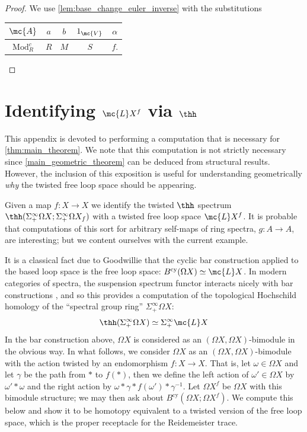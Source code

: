 \documentclass[11pt]{amsart}
\begin{document}
\begin{proof}
We use \cref{lem:base_change_euler_inverse} with the substitutions
\begin{center}
\begin{tabular}{c|c|c|c|c}
 $\mc{A}$ 
&$a$
&$b$ 
&$1_\mc{V}$
&$\alpha$
\\
\hline
 $ \operatorname{Mod}^c_R$ 
&$R$ 
&$M$ 
&$S$
&$f$. 
\end{tabular}
\end{center}
\end{proof} 



\appendix



\section{Identifying $\mc{L} X^f$ via $\thh$}\label{sect:identify_thh}



This appendix is devoted to performing a computation that is necessary for \cref{thm:main_theorem}. We note that this computation is not strictly necessary since \cref{main_geometric_theorem} can be deduced from structural results. However, the inclusion of this exposition is useful for understanding geometrically \textit{why} the twisted free loop space should be appearing. 

Given a map $f\colon  X \to X$ we identify the twisted $\thh$ spectrum $\thh(\Sigma^\infty_+ \Omega X; \Sigma^\infty_+ \Omega X_f)$ with a twisted free loop space $\mc{L}X^f$. It is probable that computations of this sort for arbitrary self-maps of ring spectra, $g\colon  A \to A$, are interesting; but we content ourselves with the current example. 

It is a classical fact due to Goodwillie \cite{goodwillie_cyclic} that the cyclic bar construction applied to the based loop space is the free loop space: $B^{\text{cy}} (\Omega X) \simeq \mc{L} X$. In modern categories of spectra, the suspension spectrum functor interacts nicely with bar constructions \cite{EKMM}, and so this provides a computation of the topological Hochschild homology of the ``spectral group ring'' $\Sigma^\infty_+ \Omega X$:
\[
\thh (\Sigma^\infty_+ \Omega X) \simeq \Sigma^\infty_+ \mc{L} X 
\]
In the bar construction above, $\Omega X$ is considered as an $(\Omega X, \Omega X)$-bimodule in the obvious way. In what follows, we consider $\Omega X$ as an $(\Omega X, \Omega X)$-bimodule with the action twisted by an endomorphism $f\colon  X \to X$. That is, let $\omega \in \Omega X$ and let $\gamma$ be the path from $\ast$ to $f(\ast)$, then we define the left action of $\omega ' \in \Omega X$ by $\omega' \ast \omega$ and the right action by $\omega \ast \gamma \ast f(\omega') \ast \gamma^{-1}$. Let $\Omega X^f$ be $\Omega X$ with this bimodule structure; we may then ask about $B^{\text{cy}} (\Omega X; \Omega X^f)$. We compute this below and show it to be homotopy equivalent to a twisted version of the free loop space, which is the proper receptacle for the Reidemeister trace.
\end{document}
